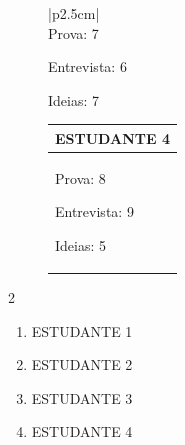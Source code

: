 \vspace*{-15pt}
        \begin{figure}[H]
            \centering
            \begin{minipage}{.33\linewidth}
                \begin{tabular}{|p{2.5cm}|}
                    \hline
                    \\
                    \hline
                    Prova: 7 \par
                    Entrevista: 6 \par 
                    Ideias: 7
                    \\
                    \hline
                    
                \end{tabular}
            \end{minipage}
            \begin{minipage}{.33\linewidth}
                \begin{tabular}{|p{2.5cm}|}
                    \hline
                    \multicolumn{1}{|c|}{ESTUDANTE 4}\\
                    \hline
                    Prova: 8 \par
                    Entrevista: 9 \par 
                    Ideias: 5
                    \\
                    \hline
                    
                \end{tabular}
            \end{minipage}
           
        \end{figure}

        \begin{multicols}{2}
            \begin{enumerate}[label=\alph*)]
                \item ESTUDANTE 1
                \item ESTUDANTE 2
                \item ESTUDANTE 3
                \item ESTUDANTE 4
            \end{enumerate}
        \end{multicols}

